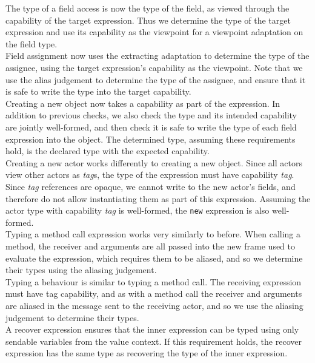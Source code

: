 The type of a field access is now the type of the field, as viewed through the capability of the target expression. Thus we determine the type of the target expression and use its capability as the viewpoint for a viewpoint adaptation on the field type. \\

Field assignment now uses the extracting adaptation to determine the type of the assignee, using the target expression's capability as the viewpoint. Note that we use the alias judgement to determine the type of the assignee, and ensure that it is safe to write the type into the target capability. \\

Creating a new object now takes a capability as part of the expression. In addition to previous checks, we also check the type and its intended capability are jointly well-formed, and then check it is safe to write the type of each field expression into the object. The determined type, assuming these requirements hold, is the declared type with the expected capability. \\

Creating a new actor works differently to creating a new object. Since all actors view other actors as \textit{tag}s, the type of the expression must have capability \textit{tag}. Since \textit{tag} references are opaque, we cannot write to the new actor's fields, and therefore do not allow instantiating them as part of this expression. Assuming the actor type with capability \textit{tag} is well-formed, the \texttt{new} expression is also well-formed. \\

Typing a method call expression works very similarly to before. When calling a method, the receiver and arguments are all passed into the new frame used to evaluate the expression, which requires them to be aliased, and so we determine their types using the aliasing judgement.  \\

Typing a behaviour is similar to typing a method call. The receiving expression must have tag capability, and as with a method call the receiver and arguments are aliased in the message sent to the receiving actor, and so we use the aliasing judgement to determine their types. \\

A recover expression ensures that the inner expression can be typed using only sendable variables from the value context. If this requirement holds, the recover expression has the same type as recovering the type of the inner expression. \\

